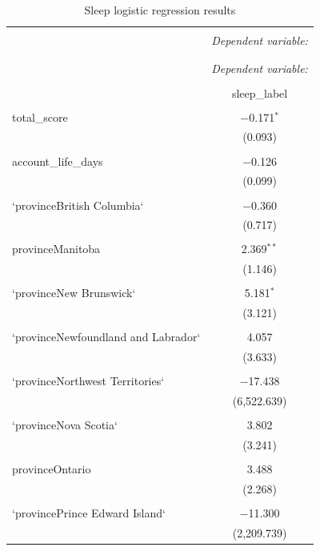 \documentclass{article}
\begin{document}
\begin{longtable}{@{\extracolsep{10pt}}lc} 
  \caption{Sleep logistic regression results} 
  \label{Sleep logistic regression results} 
\\[-1.8ex]\hline 
\hline \\[-1.8ex] 
 & \multicolumn{1}{c}{\textit{Dependent variable:}} \\ 
\cline{2-2} 
\\[-1.8ex]\hline 
\hline \\[-1.8ex] 
 & \multicolumn{1}{c}{\textit{Dependent variable:}} \\ 
\cline{2-2} 
\\[-1.8ex] & sleep\_label \\ 
\hline \\[-1.8ex] 
 total\_score & $-$0.171$^{*}$ \\ 
  & (0.093) \\ 
  & \\ 
 account\_life\_days & $-$0.126 \\ 
  & (0.099) \\ 
  & \\ 
 `provinceBritish Columbia` & $-$0.360 \\ 
  & (0.717) \\ 
  & \\ 
 provinceManitoba & 2.369$^{**}$ \\ 
  & (1.146) \\ 
  & \\ 
 `provinceNew Brunswick` & 5.181$^{*}$ \\ 
  & (3.121) \\ 
  & \\ 
 `provinceNewfoundland and Labrador` & 4.057 \\ 
  & (3.633) \\ 
  & \\ 
 `provinceNorthwest Territories` & $-$17.438 \\ 
  & (6,522.639) \\ 
  & \\ 
 `provinceNova Scotia` & 3.802 \\ 
  & (3.241) \\ 
  & \\ 
 provinceOntario & 3.488 \\ 
  & (2.268) \\ 
  & \\ 
 `provincePrince Edward Island` & $-$11.300 \\ 
  & (2,209.739) \\ 

\end{longtable}
\end{document}
